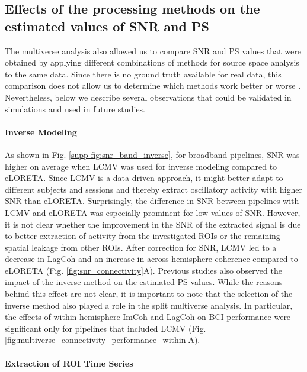 \subsection{Effects of the processing methods on the estimated values of SNR and PS}

The multiverse analysis also allowed us to compare SNR and PS values that were obtained by applying different combinations of methods for source space analysis to the same data. Since there is no ground truth available for real data, this comparison does not allow us to determine which methods work better or worse \citep{FeuerriegelBode2022}. Nevertheless, below we describe several observations that could be validated in simulations and used in future studies.

\paragraph{Inverse Modeling} 

As shown in Fig. \ref{supp-fig:snr_band_inverse}, for broadband pipelines, SNR was higher on average when LCMV was used for inverse modeling compared to eLORETA. Since LCMV is a data-driven approach, it might better adapt to different subjects and sessions and thereby extract oscillatory activity with higher SNR than eLORETA. Surprisingly, the difference in SNR between pipelines with LCMV and eLORETA was especially prominent for low values of SNR. However, it is not clear whether the improvement in the SNR of the extracted signal is due to better extraction of activity from the investigated ROIs or the remaining spatial leakage from other ROIs. After correction for SNR, LCMV led to a decrease in LagCoh and an increase in across-hemisphere coherence compared to eLORETA (Fig. \ref{fig:snr_connectivity}A). Previous studies \citep{Mahjoory2017, Pellegrini2023} also observed the impact of the inverse method on the estimated PS values. While the reasons behind this effect are not clear, it is important to note that the selection of the inverse method also played a role in the split multiverse analysis. In particular, the effects of within-hemisphere ImCoh and LagCoh on BCI performance were significant only for pipelines that included LCMV (Fig. \ref{fig:multiverse_connectivity_performance_within}A).

\paragraph{Extraction of ROI Time Series}

